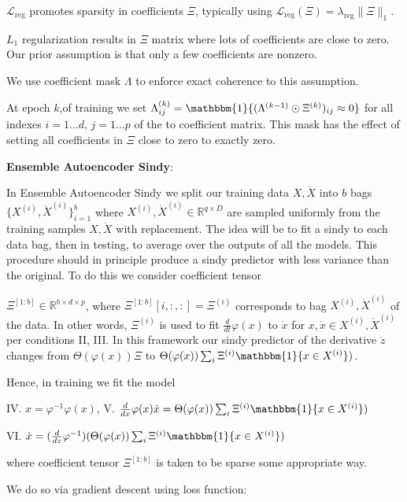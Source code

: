 \documentclass[11pt]{article}
\newcommand{\indi}{\mathbbm{1}}
\newcommand{\R}{\mathbb{R}}
\newcommand{\dd}[2]{\frac{d{#1}}{d{#2}}}
\newcommand{\tb}{\textbf}
\newcommand{\norm}[2]{\| #1 \|_{#2}}
\begin{document}
 $\mathcal{L}_\text{reg}$ promotes sparsity in  coefficients $\Xi$, typically using $\mathcal{L}_\text{reg}(\Xi) = \lambda_\text{reg}\norm{\Xi}{1}$.
 
 $L_1$ regularization results in $\Xi$ matrix where lots of coefficients are close to zero.  Our prior assumption is that only a few coefficients are nonzero. 
 
  We use coefficient mask $\Lambda$ to enforce exact coherence to this assumption.  
 
 At epoch $k$,of training we set $\Lambda ^{(k)}_{ij} = \indi\{(\Lambda ^{(k-1)}\odot \Xi^{(k)})_{ij} \approx 0\}$
 for all indexes $i=1 ... d$,  $j = 1 ...p$ of the  to coefficient matrix. This mask  has the effect of setting all coefficients in $\Xi$ close to zero to exactly zero.

 \tb{Ensemble Autoencoder Sindy}:
 
 In Ensemble Autoencoder Sindy we split our training data $X,\dot{X}$ 	into $b$ bags $\{X^{(i)},  \dot{X}^{(i)}\}_{i=1}^b$ where $X^{(i)},\dot{X}^{(i)} \in \R^{q \times D}$ are sampled uniformly from the training 
 samples $X,\dot{X}$ with replacement.  The idea will be to fit a sindy to each data bag,  then in testing,  to average over the outputs of all the models.  This procedure should in principle produce a sindy predictor with less variance than the original. To do this we  consider coefficient tensor 
  
  $\Xi^{[1:b]} \in \R^{b \times d \times p}$,  where $\Xi^{[1:b]}[i,:,:] = \Xi^{(i)}$ 
 corresponds to bag $X^{(i)},\dot{X}^{(i)}$ of the data.  In other words,  $\Xi^{(i)}$ is used to fit $\dd{}{t} \varphi(x)$ to $\dot{x}$ for $x,\dot{x} \in X^{(i)},\dot{X}^{(i)}$ per conditions II, III.
 In this framework our sindy predictor of the derivative $\dot{z}$ changes from
 $ \Theta(\varphi(x))\Xi$ to $\Theta(\varphi(x))\sum_{i} \Xi^{(i)}\indi\{x \in X^{(i)}\})$.
 
 
 Hence,  in training we fit the model 
 
  IV.  $x =  \varphi^{-1} \varphi(x)$, 
 V.  $\dd{}{x} \varphi(x)\dot{x} =  \Theta(\varphi(x))\sum_{i} \Xi^{(i)}\indi\{x \in X^{(i)}\})$
 
 VI.  $\dot{x} = (\dd{}{z} \varphi^{-1})(\Theta(\varphi(x))\sum_{i} \Xi^{(i)}\indi\{x \in X^{(i)}\})$
 
 where coefficient tensor $\Xi^{[1:b]}$ is taken to be sparse some appropriate way.
 
 We do so via gradient descent using loss function:
 
\end{document}
